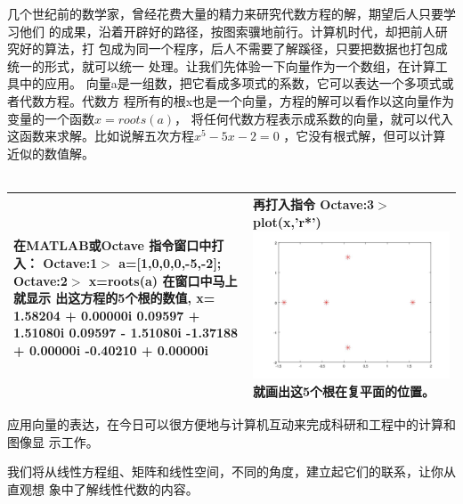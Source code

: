 几个世纪前的数学家，曾经花费大量的精力来研究代数方程的解，期望后人只要学习他们
的成果，沿着开辟好的路径，按图索骥地前行。计算机时代，却把前人研究好的算法，打
包成为同一个程序，后人不需要了解蹊径，只要把数据也打包成统一的形式，就可以统一
处理。让我们先体验一下向量作为一个数组，在计算工具中的应用。
\kaishu
向量a是一组数，把它看成多项式的系数，它可以表达一个多项式或者代数方程。代数方
程所有的根x也是一个向量，方程的解可以看作以这向量作为变量的一个函数$ x=roots(a) $，
将任何代数方程表示成系数的向量，就可以代入这函数来求解。比如说解五次方程$ x^5-5x-2=0  $ 
，它没有根式解，但可以计算近似的数值解。\\
\\
\songti
\begin{center}%
\begin{tabular}{|p{150 pt}|p{150 pt}|}
\hline
\makecell[c]{在MATLAB或Octave\\
	指令窗口中打入：\\
Octave:1$ > $  a=[1,0,0,0,-5,-2];\\
Octave:2$ > $  x=roots(a)\\
在窗口中马上就显示\\
出这方程的5个根的数值,\\
x= \\
1.58204 +  0.00000i\\
0.09597  + 1.51080i\\
0.09597  - 1.51080i\\
-1.37188  + 0.00000i\\
-0.40210  + 0.00000i\\}
&
\makecell[c]{再打入指令\\
Octave:3$ > $  plot(x,'r*')\\
\includegraphics[width = .4\textwidth]{pic/163122zo5tmql5otmldxtf.jpg}\\
就画出这5个根在复平面的位置。}
\\
\hline
\end{tabular}
\end{center}



\kaishu
应用向量的表达，在今日可以很方便地与计算机互动来完成科研和工程中的计算和图像显
示工作。

\songti
\par
我们将从线性方程组、矩阵和线性空间，不同的角度，建立起它们的联系，让你从直观想
象中了解线性代数的内容。
